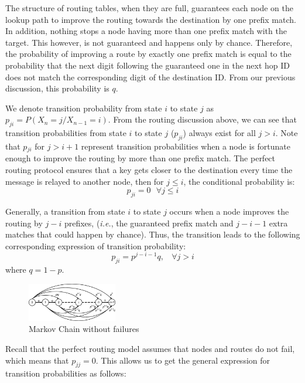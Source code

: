 \documentclass[10pt,twocolumn]{article}
\begin{document}
The structure of routing tables, when they are full, guarantees each node on
the lookup path to improve the routing towards the destination by one prefix
match. In addition, nothing stops a node having more than one prefix match with
the target. This however, is not guaranteed and happens only by chance.
Therefore, the probability of improving a route by exactly one prefix match is
equal to the probability that the next digit following the guaranteed one in
the next hop ID does not match the corresponding digit of the destination ID.
From our previous discussion, this probability is $q$.

We denote transition probability from state $i$ to state $j$ as
$p_{ji}=P(X_n = j/X_{n-1}= i)$. From the routing discussion above,
we can see that transition probabilities  from state $i$ to state
$j$ ($p_{ji}$) always exist for all $j>i$. Note that $p{_{ji}}$ for
$j
> i+1$ represent transition probabilities when a node is fortunate enough to
improve the routing by more than one prefix match. The perfect
routing protocol ensures that a key gets closer to the destination
every time the message is relayed to another node, then for $j \le
i$, the conditional probability is:
\begin{equation}
 p_{ji} = 0 ~~~\forall j \le i
\end{equation}

Generally, a transition from state $i$ to state $j$ occurs when a node improves
the routing by $j-i$ prefixes, (\emph{i.e.}, the guaranteed prefix match and
$j-i-1$ extra matches that could happen by chance). Thus, the transition leads
to the following corresponding expression of transition probability:
\begin{equation}
\label{eq.1} p_{ji} = p^{j-i-1}q, ~~~~\forall j>i
\end{equation}
where $q=1-p$.

\begin{figure}[tb] \centering
     {\includegraphics[width=0.35\textwidth]{Markov-NoFail.eps}
     \caption{Markov Chain without failures}
     \label{fig.mkv1}}
\end{figure}

Recall that the perfect routing model assumes that nodes and routes do not
fail, which means that $p_{jj} =0$. This allows us to get the general
expression for transition probabilities as follows:
\end{document}
